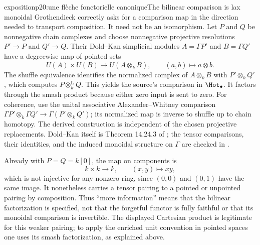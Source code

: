 \begin{dcomment}{exposition}{p20:une flèche fonctorielle canonique}{The bilinear comparison is lax monoidal}
Grothendieck correctly asks for a comparison map in the direction needed to transport composition. It need not be an isomorphism. Let $P$ and $Q$ be nonnegative chain complexes and choose nonnegative projective resolutions $P'\to P$ and $Q'\to Q$. Their Dold--Kan simplicial modules $A=\Gamma P'$ and $B=\Gamma Q'$ have a degreewise map of pointed sets
\[
 U(A)\times U(B)\longrightarrow U(A\otimes_k B),
 \qquad (a,b)\longmapsto a\otimes b.
\]
The shuffle equivalence identifies the normalized complex of $A\otimes_k B$ with $P'\otimes_k Q'$, which computes $P\otimes_k^{\mathbf L}Q$. This yields the source's comparison in $\Hot_\bullet$. It factors through the smash product because either zero input is sent to zero. For coherence, use the unital associative Alexander--Whitney comparison $\Gamma P'\otimes_k\Gamma Q'\to\Gamma(P'\otimes_k Q')$; its normalized map is inverse to shuffle up to chain homotopy. The derived construction is independent of the chosen projective replacements. Dold--Kan itself is Theorem 14.24.3 of \citet{StacksDoldKan}; the tensor comparisons, their identities, and the induced monoidal structure on $\Gamma$ are checked in \citet[\S2.3, especially equation (2.8)]{SchwedeShipley2003}.

Already with $P=Q=k[0]$, the map on components is
\[
 k\times k\longrightarrow k,\qquad (x,y)\longmapsto xy,
\]
which is not injective for any nonzero ring, since $(0,0)$ and $(0,1)$ have the same image. It nonetheless carries a tensor pairing to a pointed or unpointed pairing by composition. Thus ``more information'' means that the bilinear factorization is specified, not that the forgetful functor is fully faithful or that its monoidal comparison is invertible. The displayed Cartesian product is legitimate for this weaker pairing; to apply the enriched unit convention in pointed spaces one uses its smash factorization, as explained above.
\end{dcomment}

